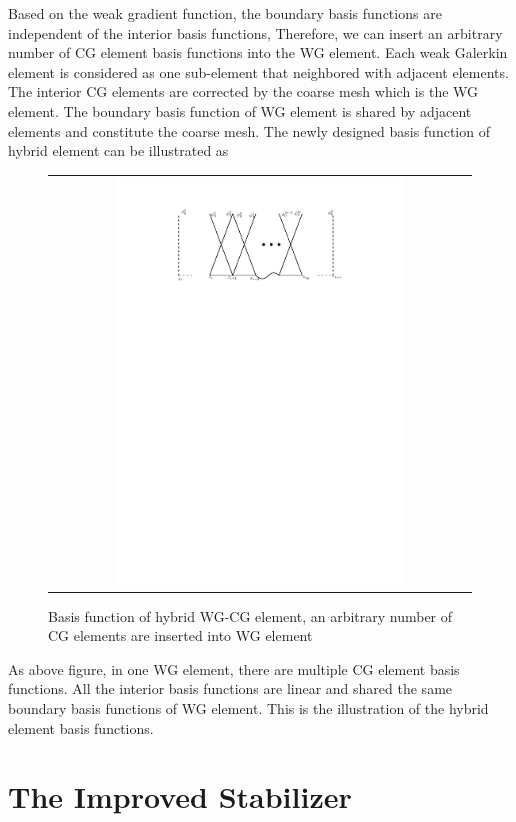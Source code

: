 Based on the weak gradient function, the boundary basis functions are independent of the interior basis functions, Therefore, we can insert an arbitrary number of CG element basis functions into the WG element. Each weak Galerkin element is considered as one sub-element that neighbored with adjacent elements. The interior CG elements are corrected by the coarse mesh which is the WG element. The boundary basis function of WG element is shared by adjacent elements and constitute the coarse mesh. The newly designed basis function of hybrid element can be illustrated as

\begin{figure}[h]
	\centering
	\begin{tabular}{c}
		\includegraphics[width=0.7\textwidth]{./pics/hybrid}
	\end{tabular}
	\caption{\footnotesize Basis function of hybrid WG-CG element, an arbitrary number of CG elements are inserted into WG element}
\end{figure}

As above figure, in one WG element, there are multiple CG element basis functions. All the interior basis functions are linear and shared the same boundary basis functions of WG element. This is the illustration of the hybrid element basis functions.

\section{The Improved Stabilizer}

